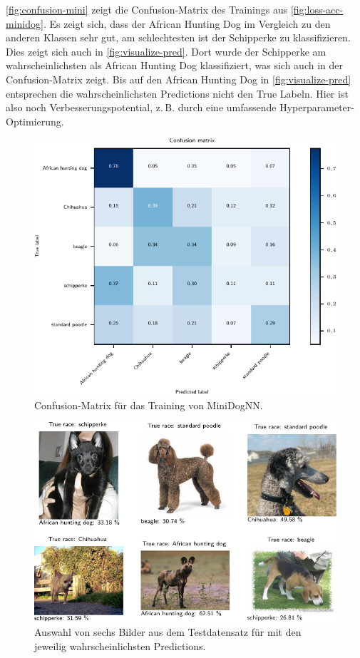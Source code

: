 \autoref{fig:confusion-mini} zeigt die Confusion-Matrix des Trainings aus
\autoref{fig:loss-acc-minidog}. Es zeigt sich, dass der African Hunting Dog im
Vergleich zu den anderen Klassen sehr gut, am schlechtesten ist der Schipperke
zu klassifizieren. Dies zeigt sich auch in \autoref{fig:visualize-pred}. Dort
wurde der Schipperke am wahrscheinlichsten als African Hunting Dog
klassifiziert, was sich auch in der Confusion-Matrix zeigt. Bis auf den African
Hunting Dog in \autoref{fig:visualize-pred} entsprechen die wahrscheinlichsten
Predictions nicht den True Labeln. Hier ist also noch Verbesserungspotential,
z.\,B. durch eine umfassende Hyperparameter-Optimierung.

\begin{figure}
  \centering
  \includegraphics[scale=0.8]{pics/ergebnisse/MiniDogNN/confusion_matrix}
  \caption{Confusion-Matrix für das Training von MiniDogNN.}
  \label{fig:confusion-mini}
\end{figure}

\begin{figure}
  \centering
  \includegraphics[scale=0.8]{pics/ergebnisse/MiniDogNN/visualize_predictions.pdf}
  \caption{Auswahl von sechs Bilder aus dem Testdatensatz für \MiniDog mit den
  jeweilig wahrscheinlichsten Predictions.}
  \label{fig:visualize-pred}
\end{figure}

